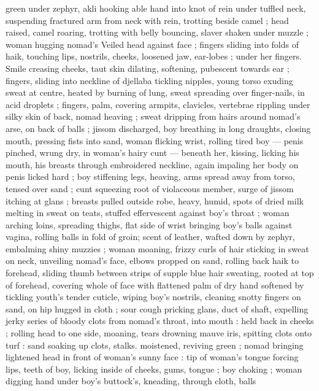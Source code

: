 green under zephyr, akli hooking able hand into knot of rein under 
tuffled neck, suspending fractured arm from neck with rein, trotting 
beside camel ; head raised, camel roaring, trotting with belly 
bouncing, slaver shaken under muzzle ; woman hugging nomad's 
Veiled head against face ; fingers sliding into folds of haik, touching 
lips, nostrils, cheeks, loosened jaw, ear-lobes ; under her fingers. 
Smile creasing cheeks, taut skin dilating, softening, pubescent 
towards ear ; fingers, sliding into neckline of djellaba tickling 
nipples, young torso exuding sweat at centre, heated by burning of 
lung, sweat spreading over finger-nails, in acid droplets ; fingers, 
palm, covering armpits, clavicles, vertebrae rippling under silky skin 
of back, nomad heaving ; sweat dripping from hairs around nomad's 
arse, on back of balls ; jissom discharged, boy breathing in long 
draughts, closing mouth, pressing fists into sand, woman flicking 
wrist, rolling tired boy --- penis pinched, wrung dry, in woman's hairy 
cunt --- beneath her, kissing, licking his mouth, his breasts through 
embroidered neckline, again impaling her body on penis licked hard 
; boy stiffening legs, heaving, arms spread away from torso, tensed 
over sand ; cunt squeezing root of violaceous member, surge of 
jissom itching at glans ; breasts pulled outside robe, heavy, humid, 
spots of dried milk melting in sweat on teats, stuffed effervescent 
against boy's throat ; woman arching loins, spreading thighs, flat 
side of wrist bringing boy's balls against vagina, rolling balls in fold 
of groin; scent of leather, wafted down by zephyr, embalming shiny 
muzzies ; woman moaning, frizzy curls of hair sticking in sweat on 
neck, unveiling nomad's face, elbows propped on sand, rolling back 
haik to forehead, sliding thumb between strips of supple blue hair 
sweating, rooted at top of forehead, covering whole of face with 
flattened palm of dry hand softened by tickling youth's tender 
cuticle, wiping boy's nostrils, cleaning snotty fingers on sand, on hip 
hugged in cloth ; sour cough pricking glans, duct of shaft, expelling 
jerky series of bloody clots from nomad's throat, into mouth : held 
back in cheeks ; rolling head to one side, moaning, tears drowning 
mauve iris, spitting clots onto turf : sand soaking up clots, stalks. 
moistened, reviving green ; nomad bringing lightened head in front 
of woman's sunny face : tip of woman's tongue forcing lips, teeth of 
boy, licking inside of cheeks, gums, tongue ; boy choking ; woman 
digging hand under boy's buttock's, kneading, through cloth, balls 
